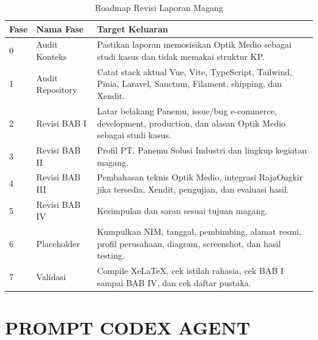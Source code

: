 \documentclass[12pt,a4paper]{report}
\begin{document}
\begin{longtable}{|p{1cm}|p{4cm}|p{8cm}|}
\caption{Roadmap Revisi Laporan Magang}\\
\hline
Fase & Nama Fase & Target Keluaran\\ \hline
0 & Audit Konteks & Pastikan laporan memosisikan Optik Medio sebagai studi kasus dan tidak memakai struktur KP.\\ \hline
1 & Audit Repository & Catat stack aktual Vue, Vite, TypeScript, Tailwind, Pinia, Laravel, Sanctum, Filament, shipping, dan Xendit.\\ \hline
2 & Revisi BAB I & Latar belakang Panemu, issue/bug e-commerce, development, production, dan alasan Optik Medio sebagai studi kasus.\\ \hline
3 & Revisi BAB II & Profil PT. Panemu Solusi Industri dan lingkup kegiatan magang.\\ \hline
4 & Revisi BAB III & Pembahasan teknis Optik Medio, integrasi RajaOngkir jika tersedia, Xendit, pengujian, dan evaluasi hasil.\\ \hline
5 & Revisi BAB IV & Kesimpulan dan saran sesuai tujuan magang.\\ \hline
6 & Placeholder & Kumpulkan NIM, tanggal, pembimbing, alamat resmi, profil perusahaan, diagram, screenshot, dan hasil testing.\\ \hline
7 & Validasi & Compile XeLaTeX, cek istilah rahasia, cek BAB I sampai BAB IV, dan cek daftar pustaka.\\ \hline
\end{longtable}

\chapter{PROMPT CODEX AGENT}
\end{document}
